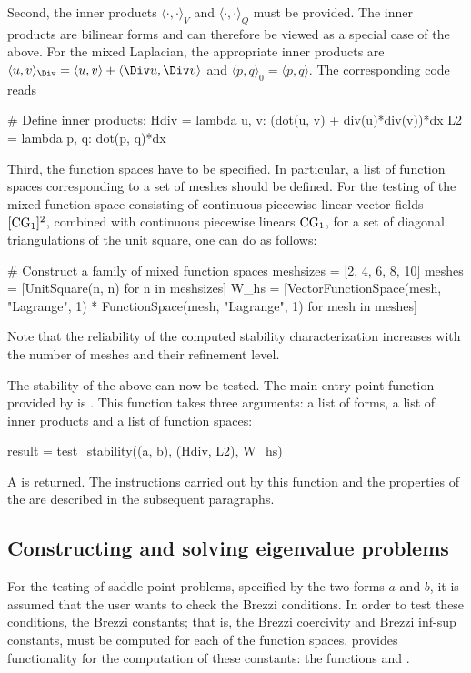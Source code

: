 Second, the inner products $\langle \cdot, \cdot \rangle_V$ and
$\langle \cdot, \cdot \rangle_Q$ must be provided. The inner products
are bilinear forms and can therefore be viewed as a special case of
the above. For the mixed Laplacian, the appropriate inner products are
$\langle u, v \rangle_{\Div} = \langle u, v \rangle + \langle \Div u,
\Div v \rangle$ and $\langle p, q \rangle_0 = \langle p, q \rangle$. The
corresponding code reads
\begin{python}
  # Define inner products:
  Hdiv = lambda u, v: (dot(u, v) + div(u)*div(v))*dx
  L2 = lambda p, q: dot(p, q)*dx
\end{python}

Third, the function spaces have to be specified. In particular, a list
of function spaces corresponding to a set of meshes should be defined.
For the testing of the mixed function space consisting of continuous
piecewise linear vector fields $[\mathrm{CG}_{1}]^{2}$, combined with
continuous piecewise linears $\mathrm{CG}_{1}$, for a set of diagonal
triangulations of the unit square, one can do as follows:
\begin{python}
  # Construct a family of mixed function spaces
  meshsizes = [2, 4, 6, 8, 10]
  meshes = [UnitSquare(n, n) for n in meshsizes]
  W_hs = [VectorFunctionSpace(mesh, "Lagrange", 1) * FunctionSpace(mesh, "Lagrange", 1)
          for mesh in meshes]
\end{python}
Note that the reliability of the computed stability characterization
increases with the number of meshes and their refinement level.

The stability of the above can now be tested. The main entry point
function provided by \rognesascot{} is . This
function takes three arguments: a list of forms, a list of inner
products and a list of function spaces:
\begin{python}
  result = test_stability((a, b), (Hdiv, L2), W_hs)
\end{python}
A  is returned.  The instructions carried out by
this function and the properties of the  are
described in the subsequent paragraphs.

\subsection{Constructing and solving eigenvalue problems}

For the testing of saddle point problems, specified by the two forms
$a$ and $b$, it is assumed that the user wants to check the Brezzi
conditions. In order to test these conditions, the Brezzi constants;
that is, the Brezzi coercivity and Brezzi inf-sup constants, must be
computed for each of the function spaces. \rognesascot{} provides
functionality for the computation of these constants: the functions
 and
.

